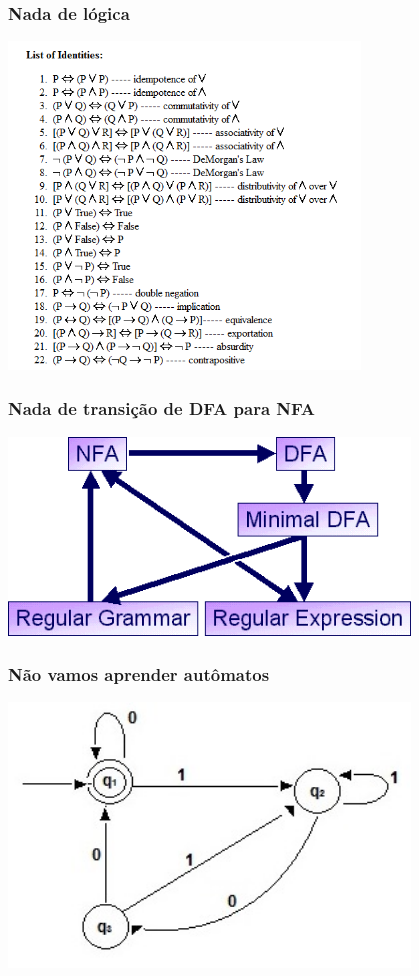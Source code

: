 \begin{frame}
\frametitle{Nada de lógica}
\centering
\includegraphics[width=0.7\textwidth]{./imagens/re/logica.png}
\end{frame}
\begin{frame}
\frametitle{Nada de transição de DFA para NFA}
\centering
\includegraphics[width=0.8\textwidth]{./imagens/re/NFA-DFA.png}
\end{frame}
\begin{frame}
\frametitle{Não vamos aprender autômatos}
\centering
\includegraphics[width=0.8\textwidth]{./imagens/re/NFA.jpg}
\end{frame}

